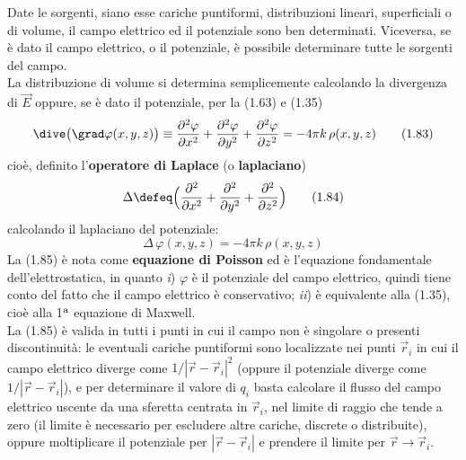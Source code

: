 Date le sorgenti, siano esse cariche puntiformi, distribuzioni lineari, superficiali o di volume, il campo elettrico ed il potenziale sono ben determinati. Viceversa, se è dato il campo elettrico, o il potenziale, è possibile determinare tutte le sorgenti del campo.\\
La distribuzione di volume si determina semplicemente calcolando la divergenza di $\vec E$ oppure, se è dato il potenziale, per la (1.63) e (1.35)
\begin{equation}
\dive\big(\grad\varphi(x,y,z)\big)\equiv\frac{\partial^2\varphi}{\partial x^2}+\frac{\partial^2\varphi}{\partial y^2}+\frac{\partial^2\varphi}{\partial z^2}=-4\pi k\,\rho(x,y,z)
\tag{1.83}
\end{equation}
cioè, definito l'\textbf{operatore di Laplace} (o \textbf{laplaciano})
\begin{equation}
\Delta\defeq\Big(\frac{\partial^2}{\partial x^2}+\frac{\partial^2}{\partial y^2}+\frac{\partial^2}{\partial z^2}\Big)
\tag{1.84}
\end{equation}
calcolando il laplaciano del potenziale:
\begin{equation}
\Delta\,\varphi(x,y,z)=-4\pi k\,\rho(x,y,z)
\tag{1.85}
\end{equation}
La (1.85) è nota come \textbf{equazione di Poisson} ed è l'equazione fondamentale dell'elettrostatica, in quanto \textit{i}) $\varphi$ è il potenziale del campo elettrico, quindi tiene conto del fatto che il campo elettrico è conservativo; \textit{ii}) è equivalente alla (1.35), cioè alla 1$^{\rm a}$ equazione di Maxwell.\\
La (1.85) è valida in tutti i punti in cui il campo non è singolare o presenti discontinuità: le eventuali cariche puntiformi sono localizzate nei punti $\vec r_i$ in cui il campo elettrico diverge come $1/|\vec r-\vec r_i|^2$ (oppure il potenziale diverge come $1/|\vec r-\vec r_i|$), e
per determinare il valore di $q_i$ basta calcolare il flusso del campo elettrico uscente da una sferetta centrata in $\vec r_i$, nel limite di raggio che tende a zero (il limite è necessario per escludere altre cariche, discrete o distribuite), oppure moltiplicare il potenziale per $|\vec r-\vec r_i|$ e prendere il limite per $\vec r\to\vec r_i$.

